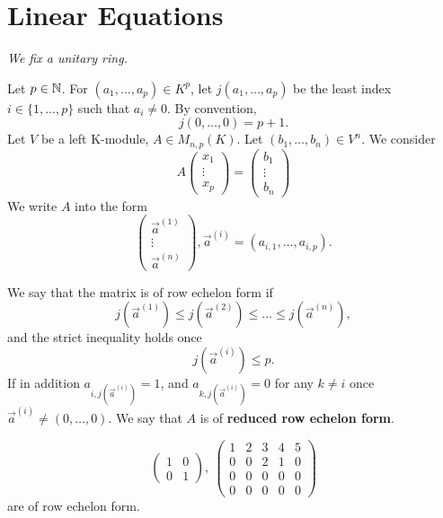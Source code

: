 \section{Linear Equations}
{\large\textit{We fix a unitary ring.}}
\begin{definitionenv}
    Let $p\in \mathbb{N}$. For $(a_1,\dots,a_p)\in K^p$, let $j(a_1,\dots,a_p)$ be the least index $i\in\{1,\dots,p\}$ such that $a_i\not=0$. By convention,
    $$j(0,\dots,0)=p+1.$$
    Let $V$ be a left K-module, $A\in M_{n,p}(K)$. Let $(b_1,\dots , b_n)\in V^n$. We consider
\begin{equation*}
A\begin{pmatrix}
 x_1\\
 \vdots\\
x_p
\end{pmatrix}=\begin{pmatrix}
 b_1\\
 \vdots\\
b_n
\end{pmatrix}\tag{$*$}
\end{equation*}
We write $A$ into the form
$$\begin{pmatrix}
 \vec{a}^{(1)} \\
 \vdots\\
 \vec{a}^{(n)}
\end{pmatrix}, \vec{a}^{(i)}=(a_{i,1},\dots,a_{i,p}).$$
\end{definitionenv}
\begin{definitionenv}
    We say that the matrix is of row echelon form if 
    $$j\left(\vec{a}^{(1)}\right)\le j\left(\vec{a}^{(2)}\right)\le \dots\le j\left(\vec{a}^{(n)}\right),$$
    and the strict inequality holds once $$j\left(\vec{a}^{(i)}\right)\le p.$$
    If in addition $a_{i,j\left(\vec{a}^{(i)}\right)}=1$,  and $a_{k,j\left(\vec{a}^{(i)}\right)}=0$ for any $k\not=i$ once $\vec{a}^{(i)}\not=(0,\dots,0)$. We say that $A$ is of \textbf{reduced row echelon form}. 
\end{definitionenv}
\begin{exampleenv}
    $$
    \begin{pmatrix}
        1&0\\
        0&1
    \end{pmatrix},\ 
\begin{pmatrix}
  1&2  &3  &4  &5 \\
  0& 0 &2  &1  &0 \\
  0& 0 &0  & 0 &0 \\
  0& 0 &  0&  0&0
\end{pmatrix}$$ are of row echelon form.
\end{exampleenv}
